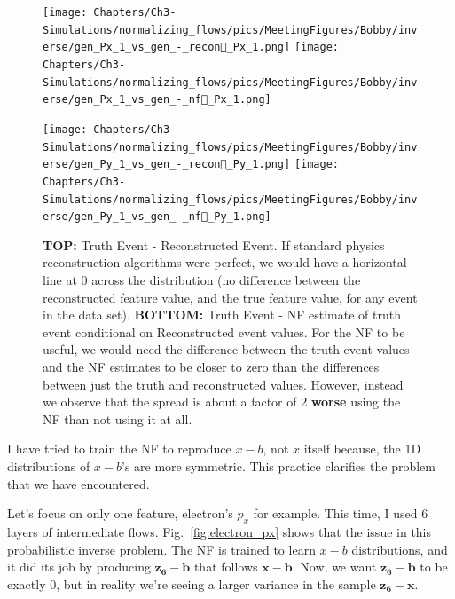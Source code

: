 \begin{figure}[htb]
    \centering
    \begin{minipage}{.5\textwidth}
    
        \centering
        
        \texttt{[image: Chapters/Ch3-Simulations/normalizing\_flows/pics/MeetingFigures/Bobby/inverse/gen\_Px\_1\_vs\_gen\_-\_recon\_Px\_1.png]}
        \texttt{[image: Chapters/Ch3-Simulations/normalizing\_flows/pics/MeetingFigures/Bobby/inverse/gen\_Px\_1\_vs\_gen\_-\_nf\_Px\_1.png]}

    \end{minipage}%
    \begin{minipage}{.5\textwidth}
    
        \centering
        
        \texttt{[image: Chapters/Ch3-Simulations/normalizing\_flows/pics/MeetingFigures/Bobby/inverse/gen\_Py\_1\_vs\_gen\_-\_recon\_Py\_1.png]}
        \texttt{[image: Chapters/Ch3-Simulations/normalizing\_flows/pics/MeetingFigures/Bobby/inverse/gen\_Py\_1\_vs\_gen\_-\_nf\_Py\_1.png]}

    \end{minipage}%
    \caption{\textbf{TOP:} Truth Event - Reconstructed Event. If standard physics reconstruction algorithms were perfect, we would have a horizontal line at 0 across the distribution (no difference between the reconstructed feature value, and the true feature value, for any event in the data set). \textbf{BOTTOM:} Truth Event - NF estimate of truth event conditional on Reconstructed event values. For the NF to be useful, we would need the difference between the truth event values and the NF estimates to be closer to zero than the differences between just the truth and reconstructed values. However, instead we observe that the spread is about a factor of 2 \textbf{worse} using the NF than not using it at all. }
    \label{fig:16features6}
\end{figure}


I have tried to train the NF to reproduce $x-b$, not $x$ itself because, the 1D distributions of $x-b$'s are more symmetric. This practice clarifies the problem that we have encountered.

Let's focus on only one feature, electron's $p_x$ for example. This time, I used 6 layers of intermediate flows. Fig.~\ref{fig:electron_px} shows that the issue in this probabilistic inverse problem.
The NF is trained to learn $x-b$ distributions, and it did its job by producing $\mathbf{z_6}-\mathbf{b}$ that follows $\mathbf{x}-\mathbf{b}$. Now, we want $\mathbf{z_6}-\mathbf{b}$ to be exactly 0, but in reality we're seeing a larger variance in the sample $\mathbf{z_6}-\mathbf{x}$.

